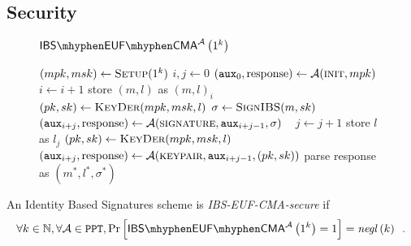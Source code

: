   \subsection{Security}
    \begin{figure}[H]
      \begin{gamebox}{$\mathsf{IBS \mhyphen EUF \mhyphen
      CMA}^{\adversary}\left(1^k\right)$}
        \begin{algorithmic}[1]
          \State $(mpk, msk) \gets \textsc{Setup}(1^k)$
          \State $i, j \gets 0$
          \State $(\mathtt{aux}_0, \mathrm{response}) \gets
          \mathcal{A}(\textsc{init}, mpk)$
              \State $i \gets i + 1$
              \State store $(m, l)$ as $(m, l)_i$
              \State $(pk, sk) \gets \textsc{KeyDer}(mpk, msk, l)$
              \State $\sigma \gets \textsc{SignIBS}(m, sk)$
              \State $(\mathtt{aux}_{i+j}, \mathrm{response}) \gets
              \mathcal{A}(\textsc{signature}, \mathtt{aux}_{i+j-1}, \sigma)$
            \Else \ 
              \State $j \gets j + 1$
              \State store $l$ as $l_j$
              \State $(pk, sk) \gets \textsc{KeyDer}(mpk, msk, l)$
              \State $(\mathtt{aux}_{i+j}, \mathrm{response}) \gets
              \mathcal{A}(\textsc{keypair}, \mathtt{aux}_{i+j-1}, (pk, sk))$
            \EndIf
          \EndWhile
          \State parse response as $(m^*, l^*, \sigma^*)$
            \State {}
          \Else
            \State {}
          \EndIf
        \end{algorithmic}
      \end{gamebox}
      \caption{}
      \label{game:ibs}
    \end{figure}
    \begin{definition}
      \label{def:ibs:secure}
      An Identity Based Signatures scheme is \emph{\textsf{IBS-EUF-CMA}-secure}
      if
      \begin{equation*}
        \forall k \in \mathbb{N}, \forall \adversary \in \mathtt{PPT},
        \Pr\left[\mathsf{IBS \mhyphen EUF \mhyphen
        CMA}^{\adversary}\left(1^k\right) = 1\right] =
        \mathit{negl}\left(k\right) \enspace.
      \end{equation*}
    \end{definition}

